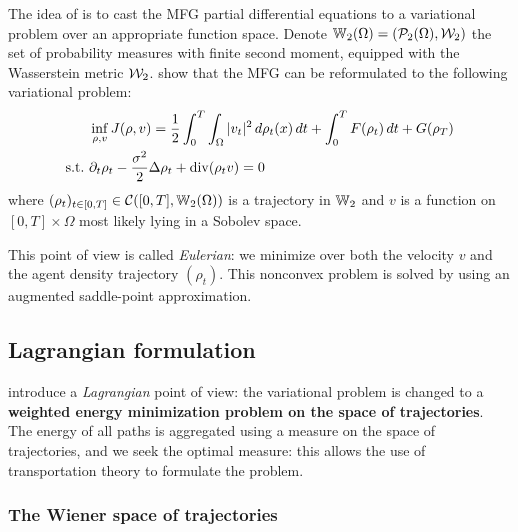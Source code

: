 \documentclass[../report.tex]{subfiles}
\begin{document}
The idea of \cite{benamou:hal-01295299} is to cast the MFG partial differential equations to a variational problem over an appropriate function space. Denote $\mathbb{W}_2(\Omega) = (\mathcal{P}_2(\Omega), \mathcal{W}_2)$ the set of probability measures with finite second moment, equipped with the Wasserstein metric $\mathcal{W}_2$.
\textcite{benamou:hal-01295299} show that the MFG can be reformulated to the following variational problem:
\begin{equation}\label{eq:EulerianProblem}
\begin{aligned}
&\inf_{\rho,v} J(\rho, v) =
\frac{1}{2}\int_0^T\int_\Omega |v_t|^2 \,d\rho_t(x)\,dt + \int_0^T F(\rho_t)\,dt + G(\rho_T)
\\
\mathrm{s.t.}\ &\partial_t \rho_t - \frac{\sigma^2}{2}\Delta \rho_t + \operatorname{div}(\rho_t v) = 0
\end{aligned}
\end{equation}
where $(\rho_t)_{t\in[0,T]}\in \mathcal{C}([0,T], \mathbb{W}_2(\Omega))$ is a trajectory in $\mathbb{W}_2$ and $v$ is a function on $[0,T] \times \Omega$ most likely lying in a Sobolev space.

This point of view is called \textit{Eulerian}: we minimize over both the velocity $v$ and the agent density trajectory $(\rho_t)$. This nonconvex problem is solved by \textcite{benamou:hal-01295299,benamou2015lagrangian} using an augmented saddle-point approximation.


\subsection{Lagrangian formulation}

\textcite{benamou:hal-01295299,benamou2018entropy} introduce a \textit{Lagrangian} point of view: the variational problem is changed to a \textbf{weighted energy minimization problem on the space of trajectories}. The energy of all paths is aggregated using a measure on the space of trajectories, and we seek the optimal measure: this allows the use of transportation theory to formulate the problem.

\subsubsection{The Wiener space of trajectories}
 
\end{document}
